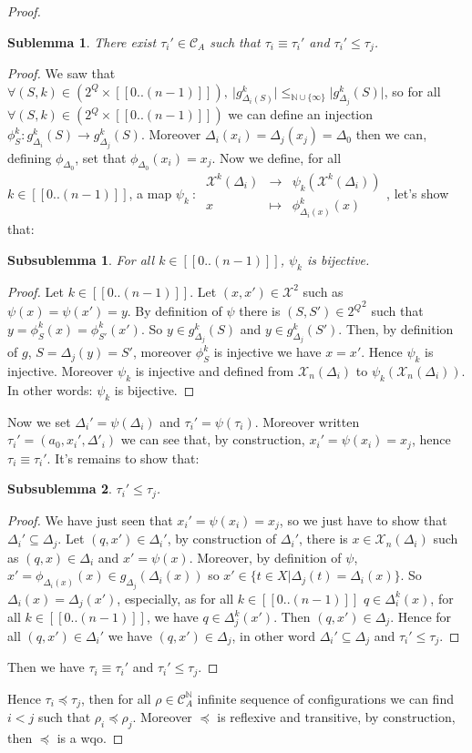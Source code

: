 \documentclass[a4paper,10pt]{report}
\newtheorem{slm}{Sublemma}[lm]
\newtheorem{sslm}{Subsublemma}[slm]
\newcommand{\dmap}[5]{
#1~:~\begin{array}{ccccc}
#2 &\to& #3 \\
#4  &\mapsto& #5
\end{array}}
\newcommand{\seg}[1]{[\![#1]\!]}
\newcommand{\ts}{\seg{0 .. (n-1)}}
\newcommand{\C}{\mathcal{C}_{A}}
\newcommand{\Xa}{\mathcal{X}}
\newcommand{\X}{\mathcal{X}_{n}}
\begin{document}
\begin {proof}
\begin{slm}
  There exist $\tau_i' \in \C$ such that $\tau_i \equiv \tau_i'$ and $\tau_i' \leq \tau_j$.
\end{slm}
\begin{proof}
We saw that $\forall (S,k) \in (2^Q \times \ts),\ \lvert g^k_{\Delta_i(S)} \lvert \leq_{\mathbb N \cup \{\infty\}} \lvert g^k_{\Delta_j}(S) \lvert$, 
so for all $\forall (S,k) \in (2^Q \times \ts)$ we can define an injection $\phi^k_S: g^k_{\Delta_i}(S) \to g^k_{\Delta_j}(S)$. 
Moreover $\Delta_i(x_i)=\Delta_j(x_j)=\Delta_0$ then we can, defining $\phi_{\Delta_0}$, set that $\phi_{\Delta_0}(x_i) = x_j$.
Now we define, for all $k \in \ts$, a map $\dmap{\psi_k}{\Xa^k(\Delta_i)}{\psi_k(\Xa^k(\Delta_i))}{x}{\phi^k_{\Delta_i(x)}(x)}$, let's show that:
\begin{sslm}
  For all $k \in \ts$, $\psi_k$ is bijective.
\end{sslm}
\begin{proof}
Let $k \in \ts$.
Let $(x,x') \in \Xa^2 $ such as $\psi(x)= \psi(x') = y$.
By definition of $\psi$ there is $(S,S')\in {2^Q}^2$ such that  $y = \phi_S^k(x) =\phi^k_{S'}(x')$. So $y\in g^k_{\Delta_j}(S)$ and  $y\in g^k_{\Delta_j}(S')$.
Then, by definition of $g$,
$S=\Delta_j(y)=S'$, moreover $\phi^k_S$ is injective we have $ x=x'$.
Hence  $\psi_k$ is injective.
Moreover $\psi_k$ is injective and defined from $\X(\Delta_i)$ to $\psi_k(\X(\Delta_i))$.
In other words: $\psi_k$ is bijective.
\end{proof}
Now we set $\Delta_i'=\psi (\Delta_i)$ and $\tau_i'=\psi (\tau_i)$. 
Moreover written $ \tau_i'=(a_0,x_i',\Delta'_i)$ we can see that, by construction, $ x_i'=\psi(x_i)=x_j$, hence $\tau_i \equiv \tau_i'$.
It's remains to show that:
\begin{sslm}
  $\tau_i' \leq \tau_j$.
\end{sslm}

\begin{proof}
  We have just seen that $ x_i'=\psi(x_i)=x_j$, so we just have to show that $\Delta_i' \subseteq \Delta_j$.
  Let $(q,x') \in \Delta_i'$, by construction of $\Delta_i'$, there is $x \in \X(\Delta_i)$ such as $(q,x) \in \Delta_i$ and $x'=\psi(x)$.
  Moreover, by definition of $\psi$, $x'=\phi_{\Delta_i(x)}(x) \in g_{\Delta_j}(\Delta_i(x))$ so $ x' \in \{ t \in X | \Delta_j(t)= \Delta_i(x) \}$.
  So $\Delta_i(x)=\Delta_j(x')$, especially, as for all $k \in \ts$ $q \in \Delta^k_i(x)$, for all $k \in \ts$, we have  $q \in \Delta^k_j(x')$.
  Then $(q,x') \in \Delta_j$.
  Hence for all $(q,x') \in \Delta_i'$ we have $(q,x') \in \Delta_j$, in other word $\Delta_i' \subseteq \Delta_j$ and $\tau_i' \leq \tau_j$.
\end{proof}
Then we have $\tau_i \equiv \tau_i'$ and  $\tau_i' \leq \tau_j$.
\end{proof}	
Hence $\tau_i \preceq \tau_j$, then for all $\rho \in \C^{\mathbb N}$ infinite sequence of configurations we can find $i < j$ such that $\rho_i \preceq \rho_j$.
Moreover $\preceq$ is reflexive and transitive, by construction, then $\preceq$ is a wqo.

\end{proof}
\end{document}
